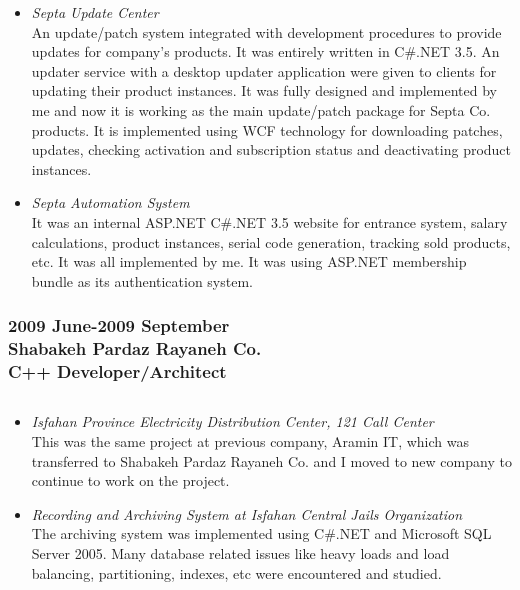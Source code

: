 \documentclass[10pt,a4paper]{article}
\begin{document}
\begin{itemize}
		\item \small \textit{Septa Update Center} \\
			An update/patch system integrated with development procedures to provide updates for company's products. It was entirely written in C\#.NET 3.5. An updater service with a desktop updater application were given to clients for updating their product instances. It was fully designed and implemented by me and now it is working as the main update/patch package for Septa Co. products. It is implemented using WCF technology for downloading patches, updates, checking activation and subscription status and deactivating product instances. \\
		\item \small \textit{Septa Automation System} \\
			It was an internal ASP.NET C\#.NET 3.5 website for entrance system, salary calculations, product instances, serial code generation, tracking sold products, etc. It was all implemented by me. It was using ASP.NET membership bundle as its authentication system.
  \end{itemize}
  \setlength{\leftskip}{0pt}
  \setlength{\rightskip}{0cm}

\subsubsection{\textnormal {2009 June-2009 September} \\ \textnormal {Shabakeh Pardaz Rayaneh Co.} \\ C++ Developer/Architect}
\subsection{}
  \setlength{\leftskip}{0.5cm}
  \setlength{\rightskip}{1cm}
	\begin{itemize}
		\item \small \textit{Isfahan Province Electricity Distribution Center, 121 Call Center} \\
		This was the same project at previous company, Aramin IT, which was transferred to Shabakeh Pardaz Rayaneh Co. and I moved to new company to continue to work on the project. \\
		\item \small \textit{Recording and Archiving System at Isfahan Central Jails Organization} \\
		The archiving system was implemented using C\#.NET and Microsoft SQL Server 2005. Many database related issues like heavy loads and load balancing, partitioning, indexes, etc were encountered and studied.
	\end{itemize}
		
\end{document}

